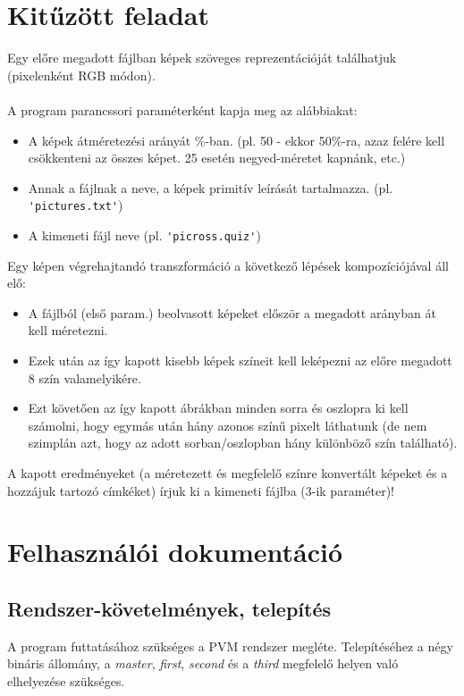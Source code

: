 \documentclass[12pt]{article}
\begin{document}
\section{Kitűzött feladat}

Egy előre megadott fájlban képek szöveges reprezentációját találhatjuk (pixelenként RGB módon). \\
\\
A program parancssori paraméterként kapja meg az alábbiakat:
\begin{itemize}
	\item A képek átméretezési arányát \%-ban. (pl. 50 - ekkor 50\%-ra, azaz felére kell csökkenteni az összes képet. 25 esetén negyed-méretet kapnánk, etc.)
	\item Annak a fájlnak a neve, a képek primitív leírását tartalmazza. (pl. \\ \verb|'pictures.txt'|)
	\item A kimeneti fájl neve (pl. \verb|'picross.quiz'|)
\end{itemize}
Egy képen végrehajtandó transzformáció a következő lépések kompozíciójával áll elő:
\begin{itemize}
	\item A fájlból (első param.) beolvasott képeket először a megadott arányban át kell méretezni.
	\item Ezek után az így kapott kisebb képek színeit kell leképezni az előre megadott 8 szín valamelyikére.
	\item Ezt követően az így kapott ábrákban minden sorra és oszlopra ki kell számolni, hogy egymás után hány azonos színű pixelt láthatunk (de nem szimplán azt, hogy az adott sorban/oszlopban hány különböző szín található).
\end{itemize}

A kapott eredményeket (a méretezett és megfelelő színre konvertált képeket és a hozzájuk tartozó címkéket) írjuk ki a kimeneti fájlba (3-ik paraméter)!

\section{Felhasználói dokumentáció}

\subsection{Rendszer-követelmények, telepítés}

A program futtatásához szükséges a PVM rendszer megléte. Telepítéséhez a négy bináris
állomány, a \textit{master}, \textit{first}, \textit{second} és a \textit{third} megfelelő helyen való elhelyezése szükséges.
\end{document}

